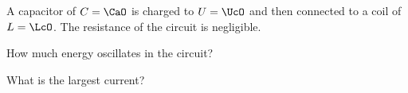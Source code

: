 A capacitor of $C = \CaO$ is charged to $U = \UcO$ and then connected to a coil of $L = \LcO$. The resistance of the circuit is negligible.

\begin{abcliste}
\abc How much energy oscillates in the circuit?

\abc What is the largest current?
\end{abcliste}
